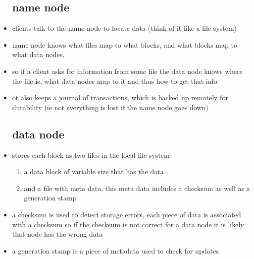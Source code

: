 \documentclass{article}
\begin{document}
\begin{itemize}
\subsection*{name node}
\item clients talk to the name node to locate data (think of it like a file system) 
\item name node knows what files map to what blocks, and what blocks map to what data nodes.
\item so if a client asks for information from some file the data node knows where the file is, what data nodes map to it and thus how to get that info 
\item ot also keeps a journal of transactions, which is backed up remotely for durability (ie not everything is lost if the name node goes down)
\subsection*{data node}
\item stores each block as two files in the local file system
\begin{enumerate}
    \item a data block  of variable size that has the data  
    \item and a file with meta data. this meta data includes a checksum as well as a generation stamp
\end{enumerate}
\item a checksum is used to detect storage errors, each piece of data is associated with a checksum so if the checksum is not correct for a data node it is likely that node has the wrong data 
\item a generation stamp is a piece of metadata used to check for updates 

\end{itemize}
\end{document}
